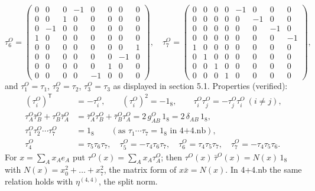 \documentclass[10pt,a4paper]{article}
\begin{document}
\begin{equation*}
\tau^{O}_6=\begin{pmatrix}0 & 0 & 0 & -1 & 0 & 0 & 0 & 0 \\ 0 & 0 & 1 & 0 & 0 & 0 & 0 & 0 \\ 0 & -1 & 0 & 0 & 0 & 0 & 0 & 0 \\ 1 & 0 & 0 & 0 & 0 & 0 & 0 & 0 \\ 0 & 0 & 0 & 0 & 0 & 0 & 0 & 1 \\ 0 & 0 & 0 & 0 & 0 & 0 & -1 & 0 \\ 0 & 0 & 0 & 0 & 0 & 1 & 0 & 0 \\ 0 & 0 & 0 & 0 & -1 & 0 & 0 & 0\end{pmatrix},\quad \tau^{O}_7=\begin{pmatrix}0 & 0 & 0 & 0 & -1 & 0 & 0 & 0 \\ 0 & 0 & 0 & 0 & 0 & -1 & 0 & 0 \\ 0 & 0 & 0 & 0 & 0 & 0 & -1 & 0 \\ 0 & 0 & 0 & 0 & 0 & 0 & 0 & -1 \\ 1 & 0 & 0 & 0 & 0 & 0 & 0 & 0 \\ 0 & 1 & 0 & 0 & 0 & 0 & 0 & 0 \\ 0 & 0 & 1 & 0 & 0 & 0 & 0 & 0 \\ 0 & 0 & 0 & 1 & 0 & 0 & 0 & 0\end{pmatrix},
\end{equation*}
and $\tau^{O}_1=\tau_1$, $\tau^{O}_2=\tau_2$, $\tau^{O}_3=\tau_3$ as displayed in section 5.1. Properties (verified):
\begin{align*}
(\tau^{O}_i)^{\mathsf T}&=-\tau^{O}_i,\qquad (\tau^{O}_i)^2=-1_8,\qquad \tau^{O}_i\tau^{O}_j=-\tau^{O}_j\tau^{O}_i\ (i\neq j), \\
\tau^{O}_A\bar\tau^{O}_B+\tau^{O}_B\bar\tau^{O}_A&=\bar\tau^{O}_A\tau^{O}_B+\bar\tau^{O}_B\tau^{O}_A=2\,g^{O}_{AB}\,1_8=2\,\delta_{AB}\,1_8, \\
\tau^{O}_1\tau^{O}_2\cdots\tau^{O}_7&=1_8\qquad(\text{as }\tau_1\cdots\tau_7=1_8\text{ in 4+4.nb}), \\
\tau^{O}_4&=\tau_5\tau_6\tau_7,\quad \tau^{O}_5=-\tau_4\tau_6\tau_7,\quad \tau^{O}_6=\tau_4\tau_5\tau_7,\quad \tau^{O}_7=-\tau_4\tau_5\tau_6.
\end{align*}
For $x=\sum_Ax_Ae_A$ put $\tau^{O}(x)=\sum_Ax_A\tau^{O}_A$; then $\tau^{O}(x)\,\bar\tau^{O}(x)=N(x)\,1_8$ with $N(x)=x_0^2+\dots+x_7^2$, the matrix form of $x\bar x=N(x)$. In 4+4.nb the same relation holds with $\eta^{(4,4)}$, the split norm.
\end{document}
